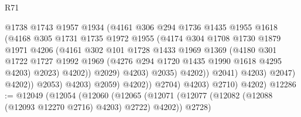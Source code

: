 \begin{lexlean}{R71}
\begin{coremodule}
                                      @1738
                                      @1743
                                      @1957
                                      @1934
                                      (@4161
                                        @306
                                        @294
                                        @1736
                                        @1435
                                        @1955
                                        @1618
                                        (@4168
                                          @305
                                          @1731
                                          @1735
                                          @1972
                                          @1955
                                          (@4174
                                            @304
                                            @1708
                                            @1730
                                            @1879
                                            @1971
                                            @4206
                                            (@4161
                                              @302
                                              @101
                                              @1728
                                              @1433
                                              @1969
                                              @1369
                                              (@4180
                                                @301
                                                @1722
                                                @1727
                                                @1992
                                                @1969
                                                (@4276 @294 @1720 @1435 @1990 @1618 @4295 @4203)
                                                @2023)
                                              @4202))
                                          @2029)
                                        @4203)
                                      @2035)
                                    @4202))
                                @2041)
                              @4203)
                            @2047)
                          @4202))
                      @2053)
                    @4203)
                  @2059)
                @4202))
            @2704)
          @4203)
        @2710)
      @4202)
@12286 := @12049
    (@12054
      (@12060
        (@12065 (@12071 (@12077 (@12082 (@12088 (@12093 @12270 @2716) @4203) @2722) @4202)) @2728)

\end{coremodule}
\end{lexlean}
